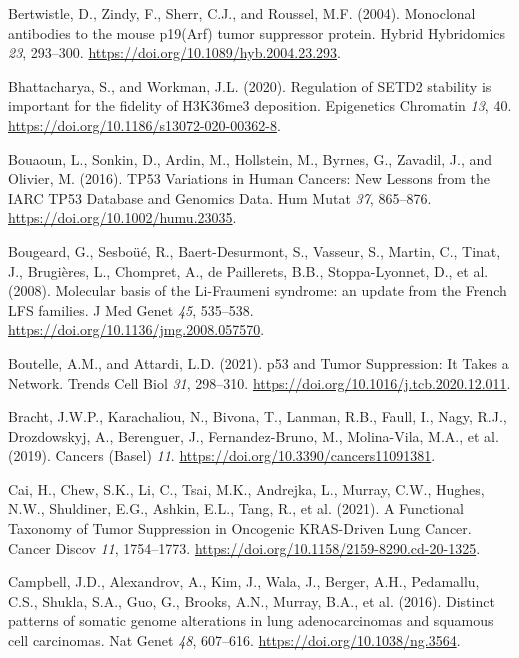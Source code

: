 \begin{CSLReferences}{0}{0}
\leavevmode{}%
Bertwistle, D., Zindy, F., Sherr, C.J., and Roussel, M.F. (2004). Monoclonal antibodies to the mouse p19(Arf) tumor suppressor protein. Hybrid Hybridomics \emph{23}, 293--300. \url{https://doi.org/10.1089/hyb.2004.23.293}.

\leavevmode{}%
Bhattacharya, S., and Workman, J.L. (2020). Regulation of SETD2 stability is important for the fidelity of H3K36me3 deposition. Epigenetics Chromatin \emph{13}, 40. \url{https://doi.org/10.1186/s13072-020-00362-8}.

\leavevmode{}%
Bouaoun, L., Sonkin, D., Ardin, M., Hollstein, M., Byrnes, G., Zavadil, J., and Olivier, M. (2016). TP53 Variations in Human Cancers: New Lessons from the IARC TP53 Database and Genomics Data. Hum Mutat \emph{37}, 865--876. \url{https://doi.org/10.1002/humu.23035}.

\leavevmode{}%
Bougeard, G., Sesboüé, R., Baert-Desurmont, S., Vasseur, S., Martin, C., Tinat, J., Brugières, L., Chompret, A., de Paillerets, B.B., Stoppa-Lyonnet, D., et al. (2008). Molecular basis of the Li-Fraumeni syndrome: an update from the French LFS families. J Med Genet \emph{45}, 535--538. \url{https://doi.org/10.1136/jmg.2008.057570}.

\leavevmode{}%
Boutelle, A.M., and Attardi, L.D. (2021). p53 and Tumor Suppression: It Takes a Network. Trends Cell Biol \emph{31}, 298--310. \url{https://doi.org/10.1016/j.tcb.2020.12.011}.

\leavevmode{}%
Bracht, J.W.P., Karachaliou, N., Bivona, T., Lanman, R.B., Faull, I., Nagy, R.J., Drozdowskyj, A., Berenguer, J., Fernandez-Bruno, M., Molina-Vila, M.A., et al. (2019). Cancers (Basel) \emph{11}. \url{https://doi.org/10.3390/cancers11091381}.

\leavevmode{}%
Cai, H., Chew, S.K., Li, C., Tsai, M.K., Andrejka, L., Murray, C.W., Hughes, N.W., Shuldiner, E.G., Ashkin, E.L., Tang, R., et al. (2021). A Functional Taxonomy of Tumor Suppression in Oncogenic KRAS-Driven Lung Cancer. Cancer Discov \emph{11}, 1754--1773. \url{https://doi.org/10.1158/2159-8290.cd-20-1325}.

\leavevmode{}%
Campbell, J.D., Alexandrov, A., Kim, J., Wala, J., Berger, A.H., Pedamallu, C.S., Shukla, S.A., Guo, G., Brooks, A.N., Murray, B.A., et al. (2016). Distinct patterns of somatic genome alterations in lung adenocarcinomas and squamous cell carcinomas. Nat Genet \emph{48}, 607--616. \url{https://doi.org/10.1038/ng.3564}.


\end{CSLReferences}

